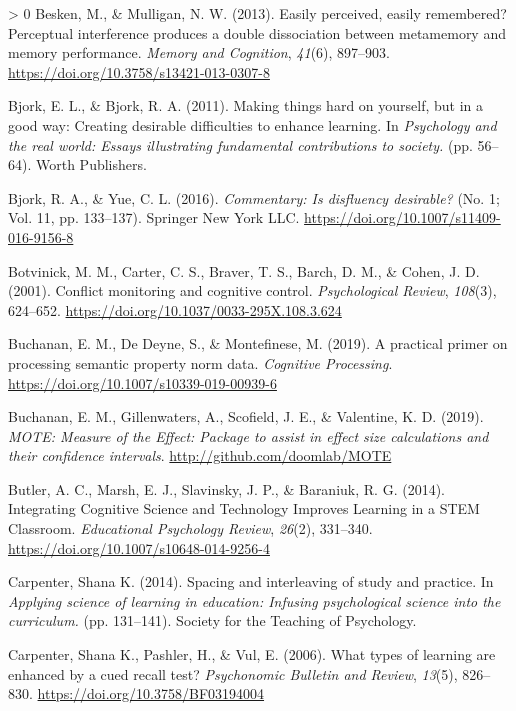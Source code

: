\documentclass[
  english,
  jou]{apa7}
\newlength{\cslhangindent}
\newenvironment{CSLReferences}[3] %
 {%
  \setlength{\parindent}{0pt}
  \ifodd #1 \everypar{\setlength{\hangindent}{\cslhangindent}}\ignorespaces\fi
  \ifnum #2 > 0
  \setlength{\parskip}{#2\baselineskip}
  \fi
 }%
 {}
\begin{document}
\begin{CSLReferences}{1}{0}
\leavevmode\hypertarget{ref-Besken2013}{}%
Besken, M., \& Mulligan, N. W. (2013). {Easily perceived, easily remembered? Perceptual interference produces a double dissociation between metamemory and memory performance}. \emph{Memory and Cognition}, \emph{41}(6), 897--903. \url{https://doi.org/10.3758/s13421-013-0307-8}

\leavevmode\hypertarget{ref-Bjork2011}{}%
Bjork, E. L., \& Bjork, R. A. (2011). {Making things hard on yourself, but in a good way: Creating desirable difficulties to enhance learning.} In \emph{Psychology and the real world: Essays illustrating fundamental contributions to society.} (pp. 56--64). Worth Publishers.

\leavevmode\hypertarget{ref-Bjork2016}{}%
Bjork, R. A., \& Yue, C. L. (2016). \emph{{Commentary: Is disfluency desirable?}} (No. 1; Vol. 11, pp. 133--137). Springer New York LLC. \url{https://doi.org/10.1007/s11409-016-9156-8}

\leavevmode\hypertarget{ref-Botvinick2001}{}%
Botvinick, M. M., Carter, C. S., Braver, T. S., Barch, D. M., \& Cohen, J. D. (2001). {Conflict monitoring and cognitive control}. \emph{Psychological Review}, \emph{108}(3), 624--652. \url{https://doi.org/10.1037/0033-295X.108.3.624}

\leavevmode\hypertarget{ref-Buchanan2019}{}%
Buchanan, E. M., De Deyne, S., \& Montefinese, M. (2019). {A practical primer on processing semantic property norm data}. \emph{Cognitive Processing}. \url{https://doi.org/10.1007/s10339-019-00939-6}

\leavevmode\hypertarget{ref-R-MOTE}{}%
Buchanan, E. M., Gillenwaters, A., Scofield, J. E., \& Valentine, K. D. (2019). \emph{{MOTE: Measure of the Effect}: Package to assist in effect size calculations and their confidence intervals}. \url{http://github.com/doomlab/MOTE}

\leavevmode\hypertarget{ref-Butler2014}{}%
Butler, A. C., Marsh, E. J., Slavinsky, J. P., \& Baraniuk, R. G. (2014). {Integrating Cognitive Science and Technology Improves Learning in a STEM Classroom}. \emph{Educational Psychology Review}, \emph{26}(2), 331--340. \url{https://doi.org/10.1007/s10648-014-9256-4}

\leavevmode\hypertarget{ref-Carpenter2014}{}%
Carpenter, Shana K. (2014). {Spacing and interleaving of study and practice.} In \emph{Applying science of learning in education: Infusing psychological science into the curriculum.} (pp. 131--141). Society for the Teaching of Psychology.

\leavevmode\hypertarget{ref-Carpenter2006}{}%
Carpenter, Shana K., Pashler, H., \& Vul, E. (2006). {What types of learning are enhanced by a cued recall test?} \emph{Psychonomic Bulletin and Review}, \emph{13}(5), 826--830. \url{https://doi.org/10.3758/BF03194004}


\end{CSLReferences}
\end{document}
